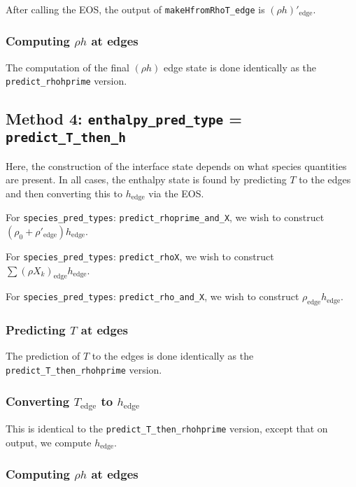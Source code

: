 After calling the EOS, the output of {\tt makeHfromRhoT\_edge} is
$(\rho h)'_\mathrm{edge}$.

\subsubsection{Computing $\rho h$ at edges}

The computation of the final $(\rho h)$ edge state is done identically
as the {\tt predict\_rhohprime} version.



\subsection{Method 4: {\tt enthalpy\_pred\_type} = {\tt predict\_T\_then\_h}}

Here, the construction of the interface state depends on what species
quantities are present.  In all cases, the enthalpy state is found by
predicting $T$ to the edges and then converting this to
$h_\mathrm{edge}$ via the EOS.

For {\tt species\_pred\_types}: {\tt predict\_rhoprime\_and\_X}, we wish to 
construct $(\rho_0 + \rho'_\mathrm{edge} ) h_\mathrm{edge}$.

For {\tt species\_pred\_types}: {\tt predict\_rhoX}, we wish to
construct $\sum(\rho X_k)_\mathrm{edge} h_\mathrm{edge}$.

For {\tt species\_pred\_types}: {\tt predict\_rho\_and\_X}, we wish to
construct $\rho_\mathrm{edge} h_\mathrm{edge}$.



\subsubsection{Predicting $T$ at edges}

The prediction of $T$ to the edges is done identically as the
{\tt predict\_T\_then\_rhohprime} version.


\subsubsection{Converting $T_\mathrm{edge}$ to $h_\mathrm{edge}$}

This is identical to the {\tt predict\_T\_then\_rhohprime} version,
except that on output, we compute $h_\mathrm{edge}$.

\subsubsection{Computing $\rho h$ at edges}

